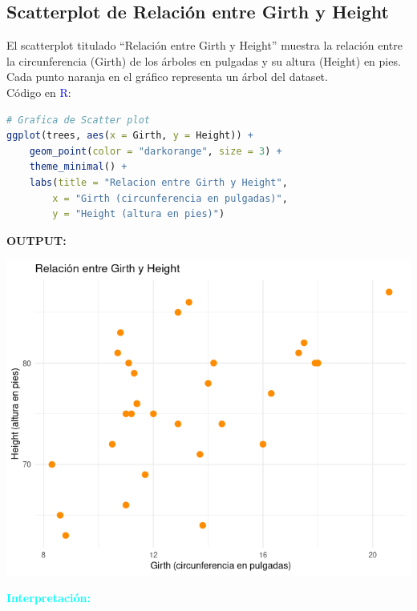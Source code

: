 \documentclass{article}
\begin{document}
\subsection{Scatterplot de Relación entre Girth y Height}
El scatterplot titulado “Relación entre Girth y Height” muestra la relación entre la circunferencia (Girth) de los árboles en pulgadas y su altura (Height) en pies. Cada punto naranja en el gráfico representa un árbol del dataset.\\
Código en \textcolor{blue}{R}:
\begin{lstlisting}[language=R, caption=Scatterplot de Relación entre Girth y Height]
# Grafica de Scatter plot
ggplot(trees, aes(x = Girth, y = Height)) +
    geom_point(color = "darkorange", size = 3) +
    theme_minimal() +
    labs(title = "Relacion entre Girth y Height",
        x = "Girth (circunferencia en pulgadas)",
        y = "Height (altura en pies)")
\end{lstlisting}
\newpage
\textbf{\textbf{OUTPUT}:}
\begin{center} 
\includegraphics[width=1.0\textwidth]{code/Plots/scatter.png}
\end{center}
\large\textbf{\textcolor{cyan}{Interpretación:}}
\end{document}
